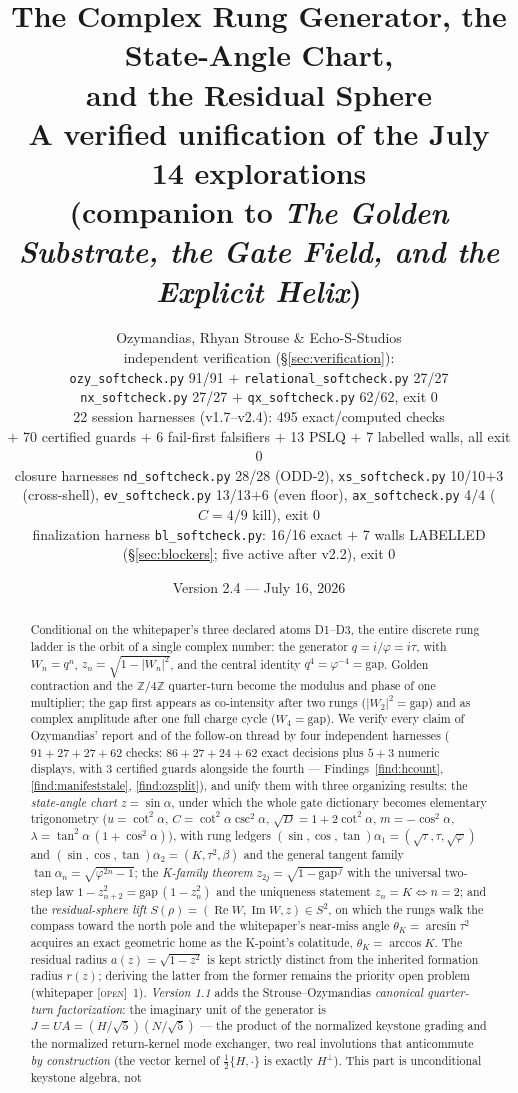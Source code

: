 \documentclass[11pt]{article}
\title{\bfseries The Complex Rung Generator, the State-Angle Chart,\\
and the Residual Sphere\\[4pt]
\large A verified unification of the July 14 explorations\\
(companion to \emph{The Golden Substrate, the Gate Field, and the Explicit Helix})}
\author{Ozymandias, Rhyan Strouse \& Echo-S-Studios\\[2pt]
\small independent verification (\S\ref{sec:verification}):\\
\small \texttt{ozy\_softcheck.py} 91/91 $+$ \texttt{relational\_softcheck.py} 27/27\\
\small \texttt{nx\_softcheck.py} 27/27 $+$ \texttt{qx\_softcheck.py} 62/62, exit 0\\
\small 22 session harnesses (v1.7--v2.4): 495 exact/computed checks\\
\small $+$ 70 certified guards $+$ 6 fail-first falsifiers $+$ 13 PSLQ $+$ 7 labelled walls, all exit 0\\
\small closure harnesses \texttt{nd\_softcheck.py} 28/28 (ODD-2), \texttt{xs\_softcheck.py} 10/10$+$3 (cross-shell), \texttt{ev\_softcheck.py} 13/13$+$6 (even floor), \texttt{ax\_softcheck.py} 4/4 ($C{=}4/9$ kill), exit 0\\
\small finalization harness \texttt{bl\_softcheck.py}: 16/16 exact $+$ 7 walls LABELLED (\S\ref{sec:blockers}; five active after v2.2), exit 0}
\date{Version 2.4 --- July 16, 2026}
\newcommand{\tagO}{\textcolor{cO}{\textsc{[open]}}}
\newcommand{\Z}{\mathbb{Z}}
\newcommand{\gp}{\varphi}
\newcommand{\gapc}{\mathrm{gap}}
\DeclareMathOperator{\Rea}{Re}
\DeclareMathOperator{\Ima}{Im}
\theoremstyle{plain}
\theoremstyle{definition}
\theoremstyle{remark}
\begin{document}
\maketitle

\begin{abstract}
\noindent
Conditional on the whitepaper's three declared atoms D1--D3, the entire discrete
rung ladder is the orbit of a single complex number: the generator
$q=i/\gp=i\tau$, with $W_n=q^n$, $z_n=\sqrt{1-|W_n|^2}$, and the central identity
$q^4=\gp^{-4}=\gapc$. Golden contraction and the $\Z/4\Z$ quarter-turn become the
modulus and phase of one multiplier; the gap first appears as co-intensity after
two rungs ($|W_2|^2=\gapc$) and as complex amplitude after one full charge cycle
($W_4=\gapc$). We verify every claim of Ozymandias' report and of the follow-on
thread by four independent harnesses ($91+27+27+62$ checks: $86{+}27{+}24{+}62$
exact decisions plus $5{+}3$ numeric displays, with $3$ certified guards
alongside the fourth --- Findings~\ref{find:hcount}, \ref{find:manifeststale},
\ref{find:ozsplit}), and unify them with three
organizing results: the \emph{state-angle chart} $z=\sin\alpha$, under which the
whole gate dictionary becomes elementary trigonometry ($u=\cot^2\alpha$,
$C=\cot^2\alpha\csc^2\alpha$, $\sqrt D=1+2\cot^2\alpha$, $m=-\cos^2\alpha$,
$\lambda=\tan^2\alpha\,(1+\cos^2\alpha)$), with rung ledgers
$(\sin,\cos,\tan)\alpha_1=(\sqrt\tau,\tau,\sqrt\gp)$ and
$(\sin,\cos,\tan)\alpha_2=(K,\tau^2,\beta)$ and the general tangent family
$\tan\alpha_n=\sqrt{\gp^{2n}-1}$; the \emph{K-family theorem}
$z_{2j}=\sqrt{1-\gapc^{\,j}}$ with the universal two-step law
$1-z_{n+2}^2=\gapc\,(1-z_n^2)$ and the uniqueness statement $z_n=K\iff n=2$; and
the \emph{residual-sphere lift} $S(\rho)=(\Rea W,\Ima W,z)\in S^2$, on which the
rungs walk the compass toward the north pole and the whitepaper's near-miss angle
$\theta_K=\arcsin\tau^2$ acquires an exact geometric home as the K-point's
colatitude, $\theta_K=\arccos K$. The residual radius $a(z)=\sqrt{1-z^2}$ is kept
strictly distinct from the inherited formation radius $r(z)$; deriving the latter
from the former remains the priority open problem (whitepaper \tagO{}~1). \emph{Version 1.1}
adds the Strouse--Ozymandias \emph{canonical quarter-turn factorization}: the
imaginary unit of the generator is
$J=UA=(H/\sqrt5)(N/\sqrt5)$ --- the product of the normalized keystone grading
and the normalized return-kernel mode exchanger, two real involutions that
anticommute \emph{by construction} (the vector kernel of $\tfrac12\{H,\cdot\}$
is exactly $H^\perp$). This part is unconditional keystone algebra, not

\end{abstract}
\end{document}
